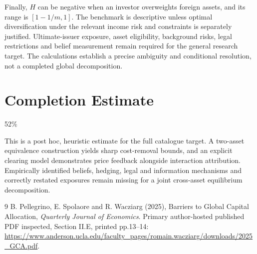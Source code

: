 \documentclass[11pt]{article}
\begin{document}
Finally, $H$ can be negative when an investor overweights foreign assets, and its range is $[1-1/m,1]$. The benchmark is descriptive unless optimal diversification under the relevant income risk and constraints is separately justified. Ultimate-issuer exposure, asset eligibility, background risks, legal restrictions and belief measurement remain required for the general research target. The calculations establish a precise ambiguity and conditional resolution, not a completed global decomposition.

\section{Completion Estimate}
52\%

This is a post hoc, heuristic estimate for the full catalogue target.
A two-asset equivalence construction yields sharp cost-removal bounds, and an explicit clearing model demonstrates price feedback alongside interaction attribution. Empirically identified beliefs, hedging, legal and information mechanisms and correctly restated exposures remain missing for a joint cross-asset equilibrium decomposition.

\begin{thebibliography}{9}
 B. Pellegrino, E. Spolaore and R. Wacziarg (2025), Barriers to Global Capital Allocation, \emph{Quarterly Journal of Economics}. Primary author-hosted published PDF inspected, Section II.E, printed pp.13--14: \url{https://www.anderson.ucla.edu/faculty_pages/romain.wacziarg/downloads/2025_GCA.pdf}.
\end{thebibliography}
\end{document}
